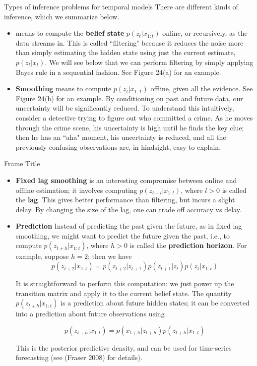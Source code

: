 \documentclass[10pt,mathserif]{beamer}
\begin{document}
\begin{frame}{Types of inference problems for temporal models}
There are different kinds of inference, which we summarize below.
\begin{itemize}
    \item \textbf{} means to compute the \textbf{belief state} $p(z_t|x_{1:t})$ online, or recursively, as the data streams in. This is called ``filtering" because it reduces the noise more than simply estimating the hidden state using just the current estimate, $p(z_t|x_t)$. We will see below that we can perform filtering by simply applying Bayes rule in a sequential fashion. See Figure 24(a) for an example.
    \item \textbf{Smoothing} means to compute $p(z_t|x_{1:T})$ offline, given all the evidence. See Figure 24(b) for an example. By conditioning on past and future data, our uncertainty will be significantly reduced. To understand this intuitively, consider a detective trying to figure out who committed a crime. As he moves through the crime scene, his uncertainty is high until he finds the key clue; then he has an ``aha" moment, his uncertainty is reduced, and all the previously confusing observations are, in hindsight, easy to explain.
\end{itemize}
\end{frame}

\begin{frame}{Frame Title}
\begin{itemize}
    \item \textbf{Fixed lag smoothing} is an interesting compromise between online and offline estimation; it involves computing $p(z_{t-l}|x_{1:t})$, where $l > 0$ is called the \textbf{lag}. This gives better performance than filtering, but incurs a slight delay. By changing the size of the lag, one can trade off accuracy vs delay.
    \item \textbf{Prediction} Instead of predicting the past given the future, as in fixed lag smoothing, we might want to predict the future given the past, i.e., to compute $p(z_{t+h}|x_{1:t})$, where $h > 0$ is called the \textbf{prediction horizon}. For example, suppose $h = 2$; then we have
    \begin{equation}
        p(z_{t+2}|x_{1:t}) = p(z_{t+2} |z_{t+1})p(z_{t+1}|z_t )p(z_t |x_{1:t})
    \end{equation}
    
    It is straightforward to perform this computation: we just power up the transition matrix and apply it to the current belief state. The quantity $p(z_{t+h}|x_{1:t})$ is a prediction about future hidden states; it can be converted into a prediction about future observations using
    
    \begin{equation}
        p(z_{t+h}|x_{1:t}) = p(x_{t+h}|z_{t+h})p(z_{t+h}|x_{1:t})
    \end{equation}
    
    This is the posterior predictive density, and can be used for time-series forecasting (see (Fraser 2008) for details).
\end{itemize}
\end{frame}
\end{document}
